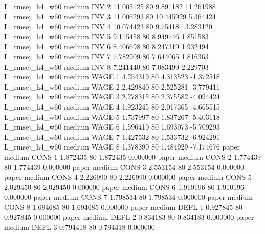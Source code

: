 L_rmsej_h4_w60     medium      INV                 2 11.005125 80       9.891182          11.261988
L_rmsej_h4_w60     medium      INV                 3 11.006293 80      10.445929           5.364424
L_rmsej_h4_w60     medium      INV                 4 10.074423 80       9.754181           3.283120
L_rmsej_h4_w60     medium      INV                 5  9.115458 80       8.949746           1.851583
L_rmsej_h4_w60     medium      INV                 6  8.406698 80       8.247319           1.932494
L_rmsej_h4_w60     medium      INV                 7  7.782909 80       7.644065           1.816363
L_rmsej_h4_w60     medium      INV                 8  7.241440 80       7.083499           2.229703
L_rmsej_h4_w60     medium     WAGE                 1  4.254319 80       4.313523          -1.372518
L_rmsej_h4_w60     medium     WAGE                 2  2.429840 80       2.525281          -3.779411
L_rmsej_h4_w60     medium     WAGE                 3  2.278315 80       2.375582          -4.094424
L_rmsej_h4_w60     medium     WAGE                 4  1.923245 80       2.017365          -4.665515
L_rmsej_h4_w60     medium     WAGE                 5  1.737997 80       1.837267          -5.403118
L_rmsej_h4_w60     medium     WAGE                 6  1.596410 80       1.693073          -5.709293
L_rmsej_h4_w60     medium     WAGE                 7  1.427532 80       1.533732          -6.924291
L_rmsej_h4_w60     medium     WAGE                 8  1.378390 80       1.484929          -7.174676
         paper     medium     CONS                 1  1.872435 80       1.872435           0.000000
         paper     medium     CONS                 2  1.774439 80       1.774439           0.000000
         paper     medium     CONS                 3  2.553154 80       2.553154           0.000000
         paper     medium     CONS                 4  2.226990 80       2.226990           0.000000
         paper     medium     CONS                 5  2.029450 80       2.029450           0.000000
         paper     medium     CONS                 6  1.910196 80       1.910196           0.000000
         paper     medium     CONS                 7  1.798534 80       1.798534           0.000000
         paper     medium     CONS                 8  1.694685 80       1.694685           0.000000
         paper     medium     DEFL                 1  0.927845 80       0.927845           0.000000
         paper     medium     DEFL                 2  0.834183 80       0.834183           0.000000
         paper     medium     DEFL                 3  0.794418 80       0.794418           0.000000
